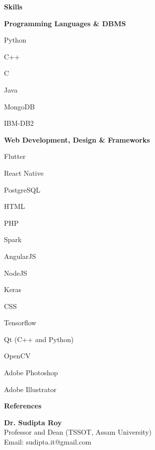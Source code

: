\documentclass[a4paper,11pt,final]{memoir}
\newcommand{\SmallSep}{\vspace{0.5em}}
\newcommand{\CVSection}[1]
	{\Large\textbf{#1}\par
	\SmallSep\normalsize\normalfont}
\newcommand{\CVItem}[1]
	{\textbf{\color{RoyalBlue} #1}}
\begin{document}
\CVSection{Skills}
\CVItem{Programming Languages \& DBMS}
\begin{multicols}{3}
\begin{compactitem}[\color{RoyalBlue}$\circ$]
	\item Python
	\item C++
	\item C
	\item Java
	\item MongoDB
	\item IBM-DB2
\end{compactitem}
\end{multicols}
\SmallSep

\CVItem{Web Development, Design \&  Frameworks}
\begin{multicols}{3}
\begin{compactitem}[\color{RoyalBlue}$\circ$]
	\item Flutter
	\item React Native
	\item PostgreSQL
	\item HTML
	\item PHP 
	\item Spark
	\item AngularJS
	\item NodeJS
	\item Keras
	\item CSS
	\item Tensorflow
	\item Qt (C++ and Python)
	\item OpenCV
	\item Adobe Photoshop
	\item Adobe Illustrator
\end{compactitem}
\end{multicols}
\SmallSep
\CVSection{References}
\CVItem{Dr. Sudipta Roy}\\
Professor and Dean (TSSOT, Assam University)\\
Email: sudipta.it@gmail.com

\end{document}

